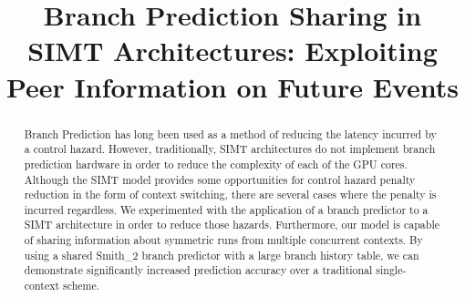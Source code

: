 \documentclass[conference]{IEEEtran}
\begin{document}
%
\title{Branch Prediction Sharing in SIMT Architectures: Exploiting Peer Information on Future Events}


\author{
\and{}
}

\maketitle

\begin{abstract} 

Branch Prediction has long been used as a method of reducing the latency incurred by a control hazard.  However, traditionally, SIMT architectures 
do not implement branch prediction hardware in order to reduce the complexity of each of the GPU cores.  Although the SIMT model provides some 
opportunities for control hazard penalty reduction in the form of context switching, there are several cases where the penalty is incurred regardless.
We experimented with the application of a branch predictor to a SIMT architecture in order to reduce those hazards.  Furthermore, our model is 
capable of sharing information about symmetric runs from multiple concurrent contexts.  By using a shared Smith\_2 branch predictor \cite{smith} with a large branch history table,
we can demonstrate significantly increased prediction accuracy over a traditional single-context scheme.

\end{abstract}

\IEEEpeerreviewmaketitle
\end{document}
